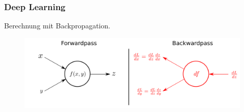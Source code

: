 \documentclass{beamer}
\begin{document}
\begin{frame} 
\frametitle{Deep Learning} 
\centering
Berechnung mit Backpropagation.\\

\begin{figure}
	\centering
	\includegraphics[width=\linewidth]{figures/chainrule.png}
	\label{img:chainrule}
\end{figure}

\end{frame}
\end{document}
